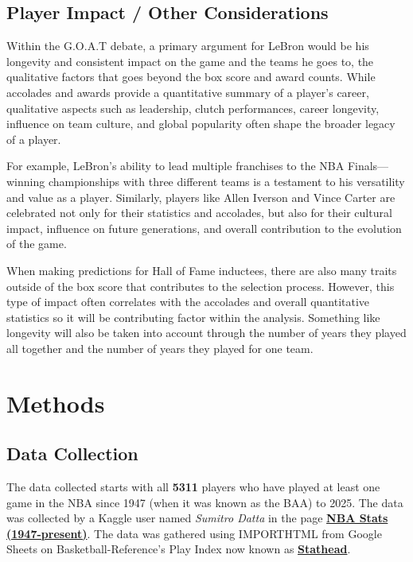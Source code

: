 \documentclass[
  11pt,
]{article}
\begin{document}
\subsection{Player Impact / Other
Considerations}\label{player-impact-other-considerations}

Within the G.O.A.T debate, a primary argument for LeBron would be his
longevity and consistent impact on the game and the teams he goes to,
the qualitative factors that goes beyond the box score and award counts.
While accolades and awards provide a quantitative summary of a player's
career, qualitative aspects such as leadership, clutch performances,
career longevity, influence on team culture, and global popularity often
shape the broader legacy of a player.

For example, LeBron's ability to lead multiple franchises to the NBA
Finals---winning championships with three different teams is a testament
to his versatility and value as a player. Similarly, players like Allen
Iverson and Vince Carter are celebrated not only for their statistics
and accolades, but also for their cultural impact, influence on future
generations, and overall contribution to the evolution of the game.

When making predictions for Hall of Fame inductees, there are also many
traits outside of the box score that contributes to the selection
process. However, this type of impact often correlates with the
accolades and overall quantitative statistics so it will be contributing
factor within the analysis. Something like longevity will also be taken
into account through the number of years they played all together and
the number of years they played for one team.

\section{Methods}\label{methods}

\subsection{Data Collection}\label{data-collection}

The data collected starts with all \textbf{5311} players who have played
at least one game in the NBA since 1947 (when it was known as the BAA)
to 2025. The data was collected by a Kaggle user named \emph{Sumitro
Datta} in the page
\textbf{\href{https://www.kaggle.com/datasets/sumitrodatta/nba-aba-baa-stats?select=Player+Career+Info.csv}{NBA
Stats (1947-present)}}. The data was gathered using IMPORTHTML from
Google Sheets on Basketball-Reference's Play Index now known as
\textbf{\href{https://stathead.com/}{Stathead}}.
\end{document}
